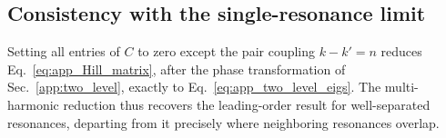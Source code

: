 \subsection{Consistency with the single-resonance limit}
\label{app:consistency}

Setting all entries of $C$ to zero except the pair coupling $k-k'=n$ reduces Eq.~\eqref{eq:app_Hill_matrix}, after the phase transformation of Sec.~\ref{app:two_level}, exactly to Eq.~\eqref{eq:app_two_level_eigs}. The multi-harmonic reduction thus recovers the leading-order result for well-separated resonances, departing from it precisely where neighboring resonances overlap.

